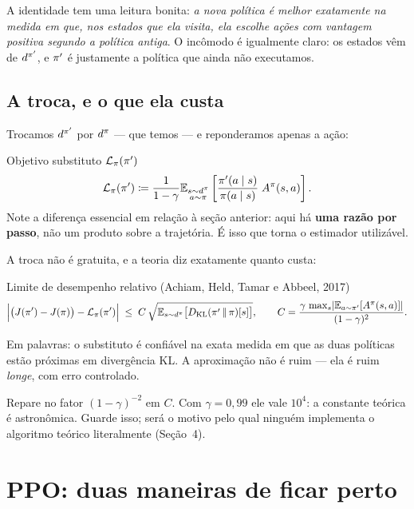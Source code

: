 \documentclass[11pt]{article}
\newcommand{\polnovo}{\pol'}
\newcommand{\Advpi}{A^{\pol}}
\newcommand{\Dkl}{D_{\mathrm{KL}}}
\newcommand{\dpi}{d^{\pol}}
\newcommand{\Lsub}[1]{\mathcal{L}_{#1}}
\begin{document}
A identidade tem uma leitura bonita: \emph{a nova política é melhor exatamente na medida
em que, nos estados que ela visita, ela escolhe ações com vantagem positiva segundo a
política antiga}. O incômodo é igualmente claro: os estados vêm de $d^{\polnovo}$, e
$\polnovo$ é justamente a política que ainda não executamos.

\subsection{A troca, e o que ela custa}

Trocamos $d^{\polnovo}$ por $\dpi$ --- que temos --- e reponderamos apenas a ação:

\begin{defbox}{Objetivo substituto $\Lsub{\pol}(\polnovo)$}
  \[
    \Lsub{\pol}(\polnovo) \defeq \frac{1}{1-\gamma}
      \E_{\substack{s\sim \dpi\\ a\sim\pol}}
      \left[\frac{\polnovo(a\mid s)}{\pol(a\mid s)}\;\Advpi(s,a)\right].
  \]
  Note a diferença essencial em relação à seção anterior: aqui há \textbf{uma razão por
  passo}, não um produto sobre a trajetória. É isso que torna o estimador utilizável.
\end{defbox}

A troca não é gratuita, e a teoria diz exatamente quanto custa:

\begin{teobox}{Limite de desempenho relativo (Achiam, Held, Tamar e Abbeel, 2017)}
  \[
    \Bigl| \bigl(J(\polnovo) - J(\pol)\bigr) - \Lsub{\pol}(\polnovo) \Bigr|
      \;\le\; C\,\sqrt{\E_{s\sim\dpi}\bigl[\Dkl(\polnovo\,\|\,\pol)[s]\bigr]},
    \qquad
    C = \frac{\gamma\,\max_{s}\abs*{\E_{a\sim\polnovo}[\Advpi(s,a)]}}{(1-\gamma)^2}.
  \]
\end{teobox}

Em palavras: o substituto é confiável na exata medida em que as duas políticas estão
próximas em divergência KL. A aproximação não é ruim --- ela é ruim \emph{longe}, com
erro controlado.

\begin{ideiabox}
  Repare no fator $(1-\gamma)^{-2}$ em $C$. Com $\gamma = 0{,}99$ ele vale $10^4$: a
  constante teórica é astronômica. Guarde isso; será o motivo pelo qual ninguém
  implementa o algoritmo teórico literalmente (Seção~4).
\end{ideiabox}

\section{PPO: duas maneiras de ficar perto}
\end{document}
